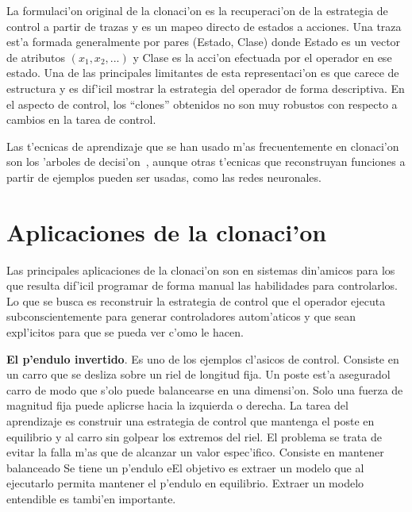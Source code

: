 \documentclass[11pt]{article}
\begin{document}
La formulaci'on original de la \textsf{clonaci'on} es la recuperaci'on de la estrategia de control a partir de trazas y es un mapeo directo de estados a acciones. Una traza est'a formada generalmente por pares (Estado, Clase) donde Estado es un vector de atributos $(x_1,x_2,...)$ y Clase es la acci'on efectuada por el operador en ese estado. Una de las principales limitantes de esta representaci'on es que carece de estructura y es dif'icil mostrar la estrategia del operador de forma descriptiva. En el aspecto de control, los ``clones'' obtenidos no son muy robustos con respecto a cambios en la tarea de control.

Las t'ecnicas de aprendizaje que se han usado m'as frecuentemente en \textsf{clonaci'on} son los \textsf{'arboles de decisi'on}~\cite{quinlan1986}, aunque otras t'ecnicas que reconstruyan funciones a partir de ejemplos pueden ser usadas, como las redes neuronales.
 
\section{Aplicaciones de la clonaci'on}
Las principales aplicaciones de la clonaci'on son en sistemas din'amicos para los que resulta dif'icil programar de forma manual las habilidades para controlarlos. Lo que se busca es reconstruir la estrategia de control que el operador ejecuta subconscientemente para generar controladores autom'aticos y que sean expl'icitos para que se pueda ver c'omo le hacen.

\medskip
\noindent

\textbf{El p'endulo invertido}. Es uno de los ejemplos cl'asicos de control. Consiste en un carro que se desliza sobre un riel de longitud fija. Un poste est'a aseguradol carro de modo que s'olo puede balancearse en una dimensi'on. Solo una fuerza de magnitud fija puede aplicrse hacia la izquierda o derecha. La tarea del aprendizaje es construir una estrategia de control que mantenga el poste en equilibrio y al carro sin golpear los extremos del riel. El problema se trata de evitar la falla m'as que de alcanzar un valor espec'ifico. Consiste en mantener balanceado Se tiene un p'endulo eEl objetivo es extraer un modelo que al ejecutarlo permita mantener el p'endulo en equilibrio. Extraer un modelo entendible es tambi'en importante.~\cite{Suc99skillmodelling}~\cite{And99modellingof}~\cite{freyre}

\medskip
\noindent
\end{document}
